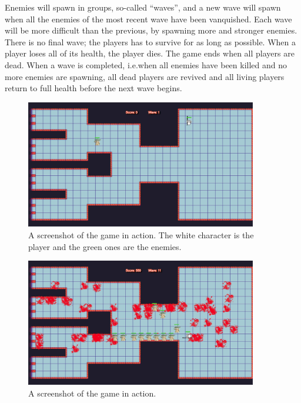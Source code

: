 \documentclass[a4paper]{article}
\begin{document}
Enemies will spawn in groups, so-called ``waves'', and a new wave will spawn when all the enemies of the most recent wave have been vanquished. Each wave will be more difficult than the previous, by spawning more and stronger enemies. There is no final wave; the players has to survive for as long as possible. When a player loses all of its health, the player dies. The game ends when all players are dead. When a wave is completed, i.e.\@ when all enemies have been killed and no more enemies are spawning, all dead players are revived and all living players return to full health before the next wave begins.

\begin{figure}[!ht]
    \centering
    \includegraphics[width=0.9\textwidth]{pics/beginning.png}
    \caption{A screenshot of the game in action. The white character is the player and the green ones are the enemies.}
    \label{fig:game}
\end{figure}

\begin{figure}[!ht]
    \centering
    \includegraphics[width=0.9\textwidth]{pics/pushedBack.png}
    \caption{A screenshot of the game in action.}
    \label{fig:game2}
\end{figure}
\end{document}
